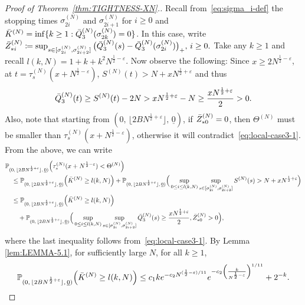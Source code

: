 \documentclass[11pt, reqno]{article}
\DeclarePairedDelimiter\autobracket{(}{)}
\newcommand{\br}[1]{\autobracket*{#1}}
\numberwithin{equation}{section}
\numberwithin{theorem}{section}
\begin{document}
\begin{proof}[Proof of Theorem~\ref{thm:TIGHTNESS-XN}.]
Recall from~\eqref{eq:sigma_i-def} the stopping times $\sigma^{(N)}_{2i}$ and $\sigma^{(N)}_{2i+1}$ for $i\geq 0$ and $\bar{K}^{(N)}=\inf \{k\geq 1:\Bar{Q}^{(N)}_3(\sigma^{(N)}_{2k})=0\}$.
In this case, write 
$
    \Bar{Z}^{(N)}_{*i}\coloneqq \sup_{s \in [\sigma^{(N)}_{2i},\sigma^{(N)}_{2i+2}]}\big(\Bar{Q}^{(N)}_3(s)-\Bar{Q}^{(N)}_3(\sigma^{(N)}_{2i})\big)_+, \, i\geq 0.
$
Take any $k \ge 1$ and recall $l(k,N)=1+k+k^2N^{\frac{1}{2}-\varepsilon}$. Now observe the following:
Since $x\geq 2N^{\frac{1}{2}-\varepsilon}$, at $t=\tau^{(N)}_s(x+N^{\frac{1}{2}-\varepsilon})$, 
$S^{(N)}(t) > N + xN^{\frac{1}{2}+\varepsilon}$ and thus 
\begin{equation}\label{eq:local-case3-1}
    \Bar{Q}^{(N)}_3(t)\geq S^{(N)}(t) -2N >xN^{\frac{1}{2}+\varepsilon} -N\geq \frac{xN^{\frac{1}{2}+\varepsilon}}{2}>0.
\end{equation}
Also, note that starting from $(0, \, \lfloor 2BN^{\frac{1}{2}+\varepsilon} \rfloor, \,\underline{0})$, if $\Bar{Z}^{(N)}_{*0} = 0$, then $\Theta^{(N)}$ must be smaller than $\tau^{(N)}_s(x+N^{\frac{1}{2}-\varepsilon})$, otherwise it will contradict~\eqref{eq:local-case3-1}.
From the above, we can write
\begin{align}\label{eq:5.4-3}
    &\mathbb{P}_{(0, \, \lfloor 2BN^{\frac{1}{2}+\varepsilon} \rfloor, \,\underline{0})}
    \br{\tau^{(N)}_s(x+N^{\frac{1}{2}-\varepsilon})<\Theta^{(N)} }\nonumber\\
    &\quad\leq \mathbb{P}_{(0, \, \lfloor 2BN^{\frac{1}{2}+\varepsilon} \rfloor, \,\underline{0})}\br{\bar{K}^{(N)}\geq l(k,N)}+\mathbb{P}_{(0, \, \lfloor 2BN^{\frac{1}{2}+\varepsilon} \rfloor, \,\underline{0})}\Big(\sup_{0\leq i\leq l(k,N)}\sup_{s\in[\sigma^{(N)}_{2i},\sigma^{(N)}_{2i+2}]} S^{(N)}(s) > N + xN^{\frac{1}{2}+\varepsilon}\Big)\nonumber\\
    &\quad\leq \mathbb{P}_{(0, \, \lfloor 2BN^{\frac{1}{2}+\varepsilon} \rfloor, \,\underline{0})}\br{\bar{K}^{(N)}\geq l(k,N)}\\
    &\qquad+\mathbb{P}_{(0, \, \lfloor 2BN^{\frac{1}{2}+\varepsilon} \rfloor, \,\underline{0})}\Big(\sup_{0\leq i\leq l(k,N)}\sup_{s\in[\sigma^{(N)}_{2i},\sigma^{(N)}_{2i+2}]}\Bar{Q}^{(N)}_3(s)\geq \frac{xN^{\frac{1}{2}+\varepsilon}}{2},\Bar{Z}^{(N)}_{*0}>0\Big),\nonumber
\end{align}
where the last inequality follows from~\eqref{eq:local-case3-1}.
By Lemma \ref{lem:LEMMA-5.1}, for sufficiently large $N$, for all $k\geq 1$,
\begin{equation}\label{eq:5.4-4}
    \mathbb{P}_{(0, \, \lfloor 2BN^{\frac{1}{2}+\varepsilon} \rfloor, \,\underline{0})}\br{\bar{K}^{(N)}\geq l(k,N)}\leq c_1 k e^{-c_2N^{(\frac{1}{2}-\varepsilon)/11}}e^{-c_2\br{\frac{k}{N^{\frac{1}{2}-\varepsilon}}}^{1/11}}+2^{-k}.

\end{equation}
\end{proof}
\end{document}
